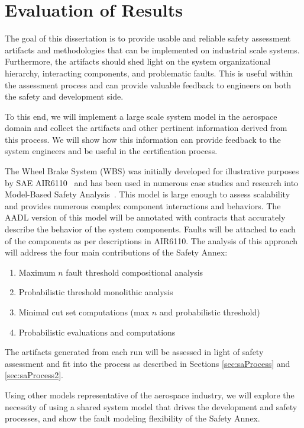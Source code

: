 \section{Evaluation of Results}
The goal of this dissertation is to provide usable and reliable safety assessment artifacts and methodologies that can be implemented on industrial scale systems. Furthermore, the artifacts should shed light on the system organizational hierarchy, interacting components, and problematic faults. This is useful within the assessment process and can provide valuable feedback to engineers on both the safety and development side. 

To this end, we will implement a large scale system model in the aerospace domain and collect the artifacts and other pertinent information derived from this process. We will show how this information can provide feedback to the system engineers and be useful in the certification process. 

The Wheel Brake System (WBS) was initially developed for illustrative purposes by SAE AIR6110~\cite{AIR6110} and has been used in numerous case studies and research into Model-Based Safety Analysis~\cite{Stewart17:IMBSA,DBLP:conf/cav/BozzanoCPJKPRT15,mcmillan2019increasing,cimatti2016temporal,cimatti2018tightening,konrad2016faa}. This model is large enough to assess scalability and provides numerous complex component interactions and behaviors. The AADL version of this model will be annotated with \agree contracts that accurately describe the behavior of the system components. Faults will be attached to each of the components as per descriptions in AIR6110. The analysis of this approach will address the four main contributions of the Safety Annex: 
\begin{enumerate}
    \item Maximum $n$ fault threshold compositional analysis
    \item Probabilistic threshold monolithic analysis 
    \item Minimal cut set computations (max $n$ and probabilistic threshold)
    \item Probabilistic evaluations and computations
\end{enumerate}

The artifacts generated from each run will be assessed in light of safety assessment and fit into the process as described in Sections \ref{sec:saProcess} and \ref{sec:saProcess2}.

Using other models representative of the aerospace industry, we will explore the necessity of using a shared system model that drives the development and safety processes, and show the fault modeling flexibility of the Safety Annex. 











